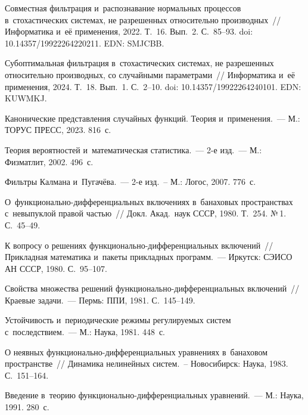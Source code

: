 \begin{multicols}{2}
{{\begin{thebibliography}{99}
Совместная фильт\-ра\-ция и~распознавание нормальных процессов в~стохастических 
сис\-те\-мах, не разрешенных относительно производных~// Информатика и~её 
применения, 2022. Т.~16. Вып.~2. С.~85--93. doi: 10.14357/19922264220211. EDN: SMJCBB.

Субоптимальная фильт\-ра\-ция в~стохастических сис\-те\-мах, не разрешенных относительно 
производных, со случайными параметрами~// Информатика и~её применения,  2024. Т.~18. Вып.~1. С.~2--10.
doi: 10.14357/19922264240101. EDN: KUWMKJ.

Канонические представления случайных функций. Тео\-рия и~применения.~--- М.: ТОРУС ПРЕСС, 2023. 816~с.



Теория вероятностей и~математическая статистика.~--- 2-е изд.~--- 
М.: Физ\-мат\-лит, 2002. 496~с.

Фильтры Калмана и~Пугачёва.~--- 2-е изд.~-- М.: Логос, 2007. 
776~с.

 О~функ\-ци\-о\-наль\-но-диф\-фе\-рен\-ци\-аль\-ных включениях в~банаховых пространствах 
 с~невыпуклой правой частью~// Докл. Акад.\ наук СССР, 1980. Т.~254. №\,1. С.~45--49.

 К вопросу о решениях функ\-ци\-о\-наль\-но-диф\-фе\-рен\-ци\-аль\-ных  включений~// Прикладная 
математика и~пакеты при\-клад\-ных программ.~--- Иркутск: СЭИСО АН СССР, 1980. С.~95--107.

 Свойства множества решений функ\-ци\-о\-наль\-но-диф\-фе\-рен\-ци\-аль\-ных включений~// Краевые 
задачи.~--- Пермь: ППИ, 1981. С.~145--149.



 Устойчивость и~периодические режимы ре\-гу\-ли\-ру\-емых сис\-тем с~последствием.~--- М.: 
Наука, 1981. 448~с.

 О неявных функ\-ци\-о\-наль\-но-диф\-фе\-рен\-ци\-аль\-ных уравнениях в~банаховом пространстве~// 
Динамика нелинейных сис\-тем.~-- Новосибирск: Наука, 1983. С.~151--164.

Введение в~тео\-рию функ\-ци\-о\-наль\-но-диф\-фе\-рен\-ци\-аль\-ных уравнений.~--- М.: Наука,  
1991. 280~с.
\end{thebibliography}

 }
 }

\end{multicols}

